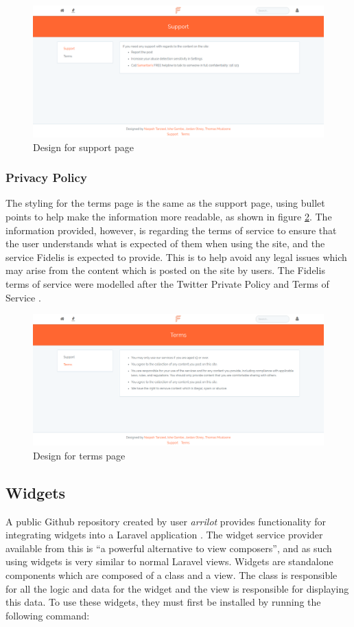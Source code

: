 \begin{figure}[H]
\centering
\includegraphics[height=2in]{Images/Design/support-page}
\caption{Design for support page}
\label{fig:SupportPage}
\end{figure}

\subsubsection{Privacy Policy}
The styling for the terms page is the same as the support page, using bullet points to help make the information more readable, as shown in figure \ref{fig:ToS}. The information provided, however, is regarding the terms of service to ensure that the user understands what is expected of them when using the site, and the service Fidelis is expected to provide. This is to help avoid any legal issues which may arise from the content which is posted on the site by users. The Fidelis terms of service were modelled after the Twitter Private Policy \cite{Twitter:PrivatePolicy} and Terms of Service \cite{Twitter:ToS}.

\begin{figure}[H]
\centering
\includegraphics[height=2in]{Images/Design/terms-page}
\caption{Design for terms page}
\label{fig:ToS}
\end{figure}

\subsection{Widgets}
A public Github repository created by user \textit{arrilot} provides functionality for integrating widgets into a Laravel application \cite{Packagist:LaravelWidgets}. The widget service provider available from this is ``a powerful alternative to view composers'', and as such using widgets is very similar to normal Laravel views. Widgets are standalone components which are composed of a class and a view. The class is responsible for all the logic and data for the widget and the view is responsible for displaying this data. To use these widgets, they must first be installed by running the following command:

